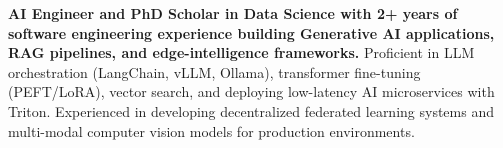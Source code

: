 \documentclass[../main.tex]{subfiles}
\begin{document}
\textbf{AI Engineer and PhD Scholar in Data Science with 2+ years of software engineering experience building Generative AI applications, RAG pipelines, and edge-intelligence frameworks.}
Proficient in LLM orchestration (LangChain, vLLM, Ollama), transformer fine-tuning (PEFT/LoRA), vector search, and deploying low-latency AI microservices with Triton.
Experienced in developing decentralized federated learning systems and multi-modal computer vision models for production environments.
\end{document}
